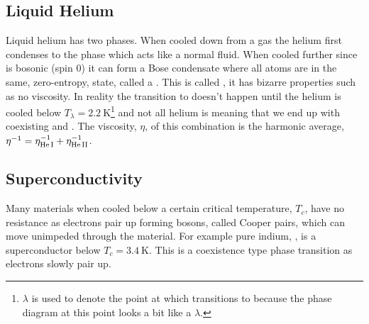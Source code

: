     
    \subsection{Liquid Helium}
    Liquid helium has two phases.
    When cooled down from a gas the helium first condenses to the phase  which acts like a normal fluid.
    When cooled further since  is bosonic (spin 0) it can form a Bose condensate where all  atoms are in the same, zero-entropy, state, called a .
    This is called , it has bizarre properties such as no viscosity.
    In reality the transition to  doesn't happen until the helium is cooled below \(T_{\lambda} = \SI{2.2}{\kelvin}\)\footnote{\(\lambda\) is used to denote the point at which  transitions to  because the phase diagram at this point looks a bit like a \(\lambda\).} and not all helium is  meaning that we end up with coexisting  and .
    The viscosity, \(\eta\), of this combination is the harmonic average, \(\eta^{-1} = \eta_{\ce{He I}}^{-1} + \eta_{\ce{He II}}^{-1}\).
    
    \subsection{Superconductivity}
    Many materials when cooled below a certain critical temperature, \(T_c\), have no resistance as electrons pair up forming bosons, called Cooper pairs, which can move unimpeded through the material.
    For example pure indium, , is a superconductor below \(T_c = \SI{3.4}{\kelvin}\).
    This is a coexistence type phase transition as electrons slowly pair up.
    
